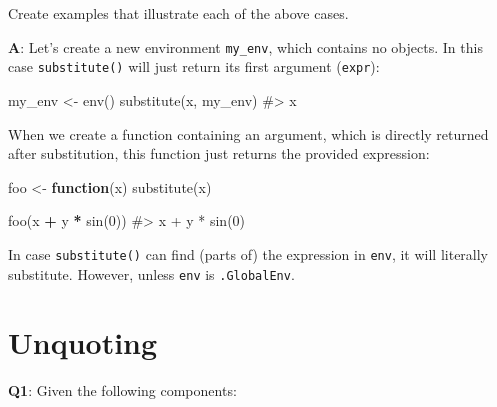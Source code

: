 \documentclass[
]{krantz}
\makeatletter
\newenvironment{Shaded}{\begin{snugshade}}{\end{snugshade}}
\newcommand{\CommentTok}[1]{\textcolor[rgb]{0.56,0.35,0.01}{\textit{#1}}}
\newcommand{\ControlFlowTok}[1]{\textcolor[rgb]{0.13,0.29,0.53}{\textbf{#1}}}
\newcommand{\DecValTok}[1]{\textcolor[rgb]{0.00,0.00,0.81}{#1}}
\newcommand{\KeywordTok}[1]{\textcolor[rgb]{0.13,0.29,0.53}{\textbf{#1}}}
\newcommand{\NormalTok}[1]{#1}
\newcommand{\OperatorTok}[1]{\textcolor[rgb]{0.81,0.36,0.00}{\textbf{#1}}}
\newcommand{\StringTok}[1]{\textcolor[rgb]{0.31,0.60,0.02}{#1}}
\newenvironment{kframe}{%
\medskip{}
\setlength{\fboxsep}{.8em}
 \def\at@end@of@kframe{}%
 \ifinner\ifhmode%
  \def\at@end@of@kframe{\end{minipage}}%
  \begin{minipage}{\columnwidth}%
 \fi\fi%
 \def\FrameCommand##1{\hskip\@totalleftmargin \hskip-\fboxsep
 \colorbox{shadecolor}{##1}\hskip-\fboxsep
     \hskip-\linewidth \hskip-\@totalleftmargin \hskip\columnwidth}%
 \MakeFramed {\advance\hsize-\width
   \@totalleftmargin\z@ \linewidth\hsize
   \@setminipage}}%
 {\par\unskip\endMakeFramed%
 \at@end@of@kframe}
\renewenvironment{Shaded}{\begin{kframe}}{\end{kframe}}
\renewcommand{\KeywordTok} [1]{\textcolor[rgb]{0.00,0.44,0.13}{{#1}}}
\renewcommand{\DecValTok}  [1]{\textcolor[rgb]{0.25,0.63,0.44}{{#1}}}
\renewcommand{\StringTok}  [1]{\textcolor[rgb]{0.25,0.44,0.63}{{#1}}}
\renewcommand{\CommentTok} [1]{\textcolor[rgb]{0.38,0.63,0.69}{{#1}}}
\renewcommand{\NormalTok}  [1]{{#1}}
\makeatother
\begin{document}
Create examples that illustrate each of the above cases.

\textbf{{A}}: Let's create a new environment \texttt{my\_env}, which contains no objects. In this case \texttt{substitute()} will just return its first argument (\texttt{expr}):

\begin{Shaded}
\begin{Highlighting}[]
\NormalTok{my_env <-}\StringTok{ }\KeywordTok{env}\NormalTok{()}
\KeywordTok{substitute}\NormalTok{(x, my_env)}
\CommentTok{#> x}
\end{Highlighting}
\end{Shaded}

When we create a function containing an argument, which is directly returned after substitution, this function just returns the provided expression:

\begin{Shaded}
\begin{Highlighting}[]
\NormalTok{foo <-}\StringTok{ }\ControlFlowTok{function}\NormalTok{(x) }\KeywordTok{substitute}\NormalTok{(x)}

\KeywordTok{foo}\NormalTok{(x }\OperatorTok{+}\StringTok{ }\NormalTok{y }\OperatorTok{*}\StringTok{ }\KeywordTok{sin}\NormalTok{(}\DecValTok{0}\NormalTok{))}
\CommentTok{#> x + y * sin(0)}
\end{Highlighting}
\end{Shaded}

In case \texttt{substitute()} can find (parts of) the expression in \texttt{env}, it will literally substitute. However, unless \texttt{env} is \texttt{.GlobalEnv}.

\begin{Shaded}
\end{Shaded}

\hypertarget{unquoting}{%
\section{Unquoting}\label{unquoting}}

\textbf{{Q1}}: Given the following components:
\end{document}
